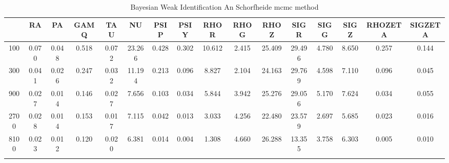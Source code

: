 \documentclass[a4paper,10pt]{article}
\begin{document}
\centering
\begin{longtable}{cccccccccccccccc}
\toprule
 & RA & PA & GAMQ & TAU & NU & PSIP & PSIY & RHOR & RHOG & RHOZ & SIGR & SIGG & SIGZ & RHOZETA & SIGZETA \\
\midrule
100 & 0.070 & 0.048 & 0.518 & 0.072 & 23.266 & 0.428 & 0.302 & 10.612 & 2.415 & 25.409 & 29.496 & 4.780 & 8.650 & 0.257 & 0.144 \\
300 & 0.041 & 0.026 & 0.247 & 0.032 & 11.194 & 0.213 & 0.096 & 8.827 & 2.104 & 24.163 & 29.769 & 4.598 & 7.110 & 0.096 & 0.045 \\
900 & 0.027 & 0.014 & 0.146 & 0.027 & 7.656 & 0.103 & 0.034 & 5.844 & 3.942 & 25.276 & 29.056 & 5.170 & 7.624 & 0.034 & 0.055 \\
2700 & 0.028 & 0.014 & 0.153 & 0.017 & 7.115 & 0.042 & 0.013 & 3.033 & 4.256 & 22.480 & 23.579 & 2.697 & 5.685 & 0.023 & 0.016 \\
8100 & 0.023 & 0.012 & 0.120 & 0.020 & 6.381 & 0.014 & 0.004 & 1.308 & 4.660 & 26.288 & 13.355 & 3.758 & 6.303 & 0.005 & 0.010 \\
\bottomrule
\caption{Bayesian Weak Identification An Schorfheide mcmc method}
\label{table:tbl:WeakAnScho_mcmc}
\end{longtable}
\end{document}
